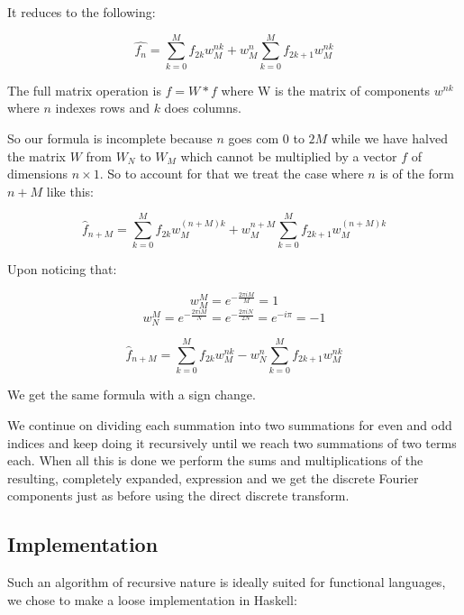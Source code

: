 \documentclass[titlepage]{article}
\begin{document}
It reduces to the following:

$$\hat{f_n} = \sum_{k=0}^{M} f_{2k}w^{nk}_M + w_M^n\sum_{k=0}^{M} f_{2k+1}w^{nk}_M$$

The full matrix operation is $\hat{f} = W*f$ where W is the matrix of components $w^{nk}$ where $n$ indexes rows and $k$ does columns.

So our formula is incomplete because $n$ goes com $0$ to $2M$ while we have halved the matrix $W$ from $W_N$ to $W_M$ which cannot be multiplied by a vector $f$ of dimensions $n\times 1$. So to account for that we treat the case where $n$ is of the form $n + M$ like this:

$$\hat{f}_{n+M} = \sum_{k=0}^{M} f_{2k}w^{(n+M)k}_M + w_M^{n+M}\sum_{k=0}^{M} f_{2k+1}w^{(n+M)k}_M$$

Upon noticing that:

$$w^M_M = e^{-\frac{2\pi iM}{M}}=1$$
$$w^M_N = e^{-\frac{2\pi iM}{N}}=e^{-\frac{2\pi iN}{2N}}=e^{-i\pi}=-1$$

$$\hat{f}_{n+M} = \sum_{k=0}^M f_{2k}w^{nk}_M - w^n_N\sum_{k=0}^M f_{2k+1}w^{nk}_M$$

We get the same formula with a sign change.

We continue on dividing each summation into two summations for even and odd indices and keep doing it recursively until we reach two summations of two terms each. When all this is done we perform the sums and multiplications of the resulting, completely expanded, expression and we get the discrete Fourier components just as before using the direct discrete transform.

\subsection{Implementation}

Such an algorithm of recursive nature is ideally suited for functional languages, we chose to make a loose implementation in Haskell:
\end{document}
